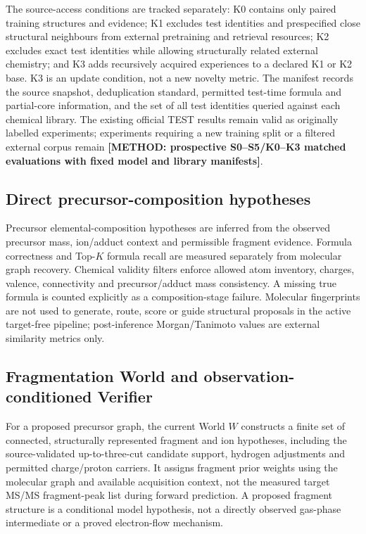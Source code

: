 \documentclass[11pt]{article}
\newcommand{\methodtodo}[1]{\textbf{\textcolor{orbitviolet}{[METHOD: #1]}}}
\begin{document}
The source-access conditions are tracked separately: K0 contains only paired training structures and evidence; K1 excludes test identities and prespecified close structural neighbours from external pretraining and retrieval resources; K2 excludes exact test identities while allowing structurally related external chemistry; and K3 adds recursively acquired experiences to a declared K1 or K2 base. K3 is an update condition, not a new novelty metric. The manifest records the source snapshot, deduplication standard, permitted test-time formula and partial-core information, and the set of all test identities queried against each chemical library. The existing official TEST results remain valid as originally labelled experiments; experiments requiring a new training split or a filtered external corpus remain \methodtodo{prospective S0--S5/K0--K3 matched evaluations with fixed model and library manifests}.

\subsection*{Direct precursor-composition hypotheses}
Precursor elemental-composition hypotheses are inferred from the observed precursor mass, ion/adduct context and permissible fragment evidence. Formula correctness and Top-\(K\) formula recall are measured separately from molecular graph recovery. Chemical validity filters enforce allowed atom inventory, charges, valence, connectivity and precursor/adduct mass consistency. A missing true formula is counted explicitly as a composition-stage failure. Molecular fingerprints are not used to generate, route, score or guide structural proposals in the active target-free pipeline; post-inference Morgan/Tanimoto values are external similarity metrics only.

\subsection*{Fragmentation World and observation-conditioned Verifier}
For a proposed precursor graph, the current World \(W\) constructs a finite set of connected, structurally represented fragment and ion hypotheses, including the source-validated up-to-three-cut candidate support, hydrogen adjustments and permitted charge/proton carriers. It assigns fragment prior weights using the molecular graph and available acquisition context, not the measured target MS/MS fragment-peak list during forward prediction. A proposed fragment structure is a conditional model hypothesis, not a directly observed gas-phase intermediate or a proved electron-flow mechanism.
\end{document}

